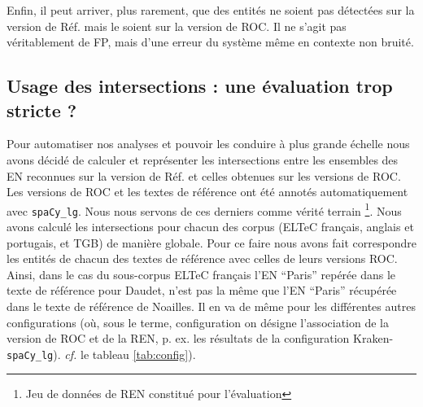 Enfin, il peut arriver, plus rarement, que des entités ne soient pas détectées sur la version de Réf. mais le soient sur la version de ROC. Il ne s'agit pas véritablement de FP, mais d'une erreur du système même en contexte non bruité.


\subsection{Usage des intersections : une évaluation trop stricte ?}
\label{subsec:inter_OCR-IMPACT-NER}
Pour automatiser nos analyses et pouvoir les conduire à plus grande échelle nous avons décidé de calculer et représenter les intersections entre les ensembles des EN reconnues sur la version de Réf. et celles obtenues sur les versions de ROC. Les versions de ROC et les textes de référence ont été annotés automatiquement avec \texttt{spaCy\_lg}. Nous nous servons de ces derniers comme vérité terrain \footnote{Jeu de données de REN constitué pour l'évaluation}. Nous avons calculé les intersections pour chacun des corpus (ELTeC français, anglais et portugais, et TGB) de manière globale. 
Pour ce faire nous avons fait correspondre les entités de chacun des textes de référence avec celles de leurs versions ROC. Ainsi, dans le cas du sous-corpus ELTeC français l'EN ``Paris'' repérée dans le texte de référence pour Daudet, n'est pas la même que l'EN ``Paris'' récupérée dans le texte de référence de Noailles. Il en va de même pour les différentes autres configurations (où, sous le terme, \og{}configuration\fg{} on désigne l’association de la version de ROC et de la REN, p. ex. les résultats de la configuration Kraken-\texttt{spaCy\_lg}). \textit{cf.} le tableau \ref{tab:config}).

